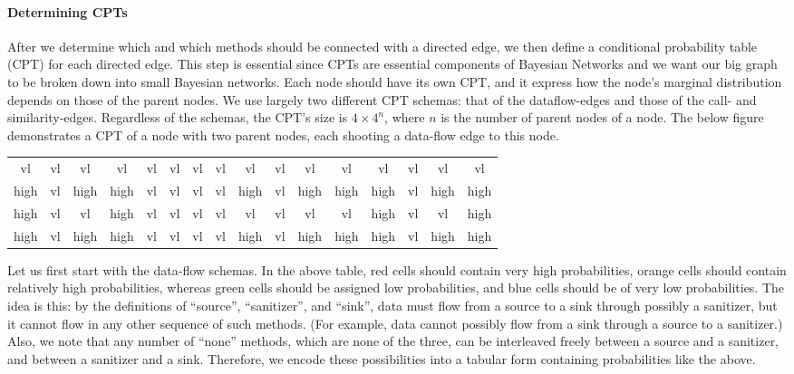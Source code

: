 \paragraph{Determining CPTs}

After we determine which and which methods should be connected with a directed
edge, we then define a conditional probability table (CPT) for each directed
edge. This step is essential since CPTs are essential components of Bayesian
Networks and we want our big graph to be broken down into small
Bayesian networks. Each node should have its own CPT, and it express how the
node's marginal distribution depends
on those of the parent nodes. We use largely two different CPT schemas:
that of the dataflow-edges and those of the call- and similarity-edges.
Regardless of the schemas, the CPT's size is $4\times 4^n$, where $n$ is the
number of parent nodes of a node. The below figure demonstrates a CPT of a node
with two parent nodes, each shooting a data-flow edge to this node.

\begin{center}
  \begin{tabular} { |c|c|c|c|c|c|c|c|c|c|c|c|c|c|c|c| }
    \hline
    vl   & vl   & vl   & vl   & vl   & vl   & vl   & vl   & vl   & vl   & vl   & vl   & vl   & vl   & vl   & vl  \\
    high & vl   & high & high & vl   & vl   & vl   & vl   & high & vl   & high & high & high & vl   & high & high\\
    high & vl   & vl   & high & vl   & vl   & vl   & vl   & vl   & vl   & vl   & vl   & high & vl   & vl   & high\\
    high & vl   & high & high & vl   & vl   & vl   & vl   & high & vl   & high & high & high & vl   & high & high\\
    \hline
  \end{tabular}
\end{center}

Let us first start with the data-flow schemas. In the above table, red cells
should contain very high probabilities, orange
cells should contain relatively high probabilities, whereas green cells should
be assigned low probabilities, and blue cells should be of very low probabilities.
The idea is this: by the definitions of ``source'', ``sanitizer'', and ``sink'',
data must flow from a source to a sink through possibly a sanitizer, but it
cannot flow in any other sequence of such methods. (For example, data cannot
possibly flow from a sink through a source to a sanitizer.) Also, we note that
any number of ``none'' methods, which are none of the three, can be interleaved
freely between a source and a sanitizer, and between a sanitizer and a sink.
Therefore, we encode these possibilities into a tabular form containing probabilities
like the above.

